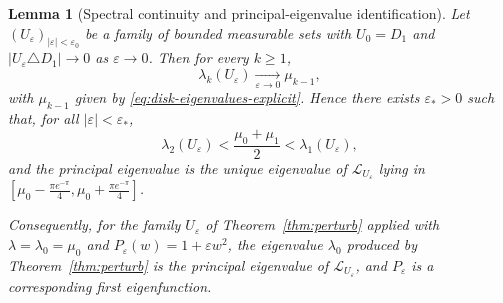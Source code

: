\documentclass[a4paper,11pt,reqno]{amsart}
\numberwithin{equation}{section}
\theoremstyle{plain} %
\newtheorem{lemma}{Lemma}[section]
\theoremstyle{definition} %
\theoremstyle{remark}
\begin{document}
\begin{lemma}[Spectral continuity and principal-eigenvalue identification]
\label{lem:spectral-continuity}
Let \((U_\varepsilon)_{|\varepsilon|<\varepsilon_0}\) be a family of bounded
measurable sets with \(U_0=D_1\) and
\(|U_\varepsilon\triangle D_1|\to 0\) as \(\varepsilon\to 0\). Then for every
\(k\ge 1\),
\begin{equation}\label{eq:eigenvalue-continuity}
\lambda_k(U_\varepsilon)\xrightarrow[\varepsilon\to 0]{}\mu_{k-1},
\end{equation}
with \(\mu_{k-1}\) given by \eqref{eq:disk-eigenvalues-explicit}. Hence there
exists \(\varepsilon_*>0\) such that, for all \(|\varepsilon|<\varepsilon_*\),
\begin{equation}\label{eq:gap-preservation}
\lambda_2(U_\varepsilon)
<
\frac{\mu_0+\mu_1}{2}
<
\lambda_1(U_\varepsilon),
\end{equation}
and the principal eigenvalue is the unique eigenvalue of
\(\mathcal L_{U_\varepsilon}\) lying in
\([\mu_0-\tfrac{\pi e^{-\pi}}{4},\mu_0+\tfrac{\pi e^{-\pi}}{4}]\).

Consequently, for the family \(U_\varepsilon\) of Theorem~\ref{thm:perturb}
applied with \(\lambda=\lambda_0=\mu_0\) and
\(P_\varepsilon(w)=1+\varepsilon w^2\), the eigenvalue \(\lambda_0\) produced
by Theorem~\ref{thm:perturb} is the principal eigenvalue of
\(\mathcal L_{U_\varepsilon}\), and \(P_\varepsilon\) is a corresponding
first eigenfunction.
\end{lemma}
\end{document}
